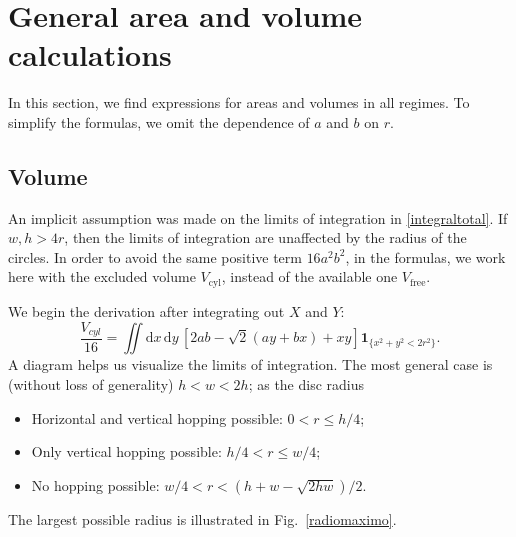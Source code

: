 \documentclass[superscriptaddress,pre,reprint,showpacs,twocolumn]{revtex4-1}
\newcommand{\rd}[1]{\mathrm{d}{#1} \,}
\newcommand{\indicatorsymbol}{\mathbf{1}}
\newcommand{\indicator}[1]{\indicatorsymbol_{ \{   #1 \} } }
\begin{document}




\appendix
\section{General area and volume calculations}
\label{app:area_volume}

In this section, we find expressions for areas and volumes in all 
regimes.
To simplify the formulas, we omit the dependence
of $a$ and $b$ on $r$.



\subsection{Volume}\label{app:volume}


An implicit assumption was made on the limits of integration
in \eqref{integraltotal}. If $w, h > 4r$, then the limits of integration
are unaffected by the radius of the circles.
In order to avoid the same positive term $16a^2b^2$,  %
in the formulas, we work here with
the excluded volume $V_\text{cyl}$, instead of the available one $V_\text{free}$. 


We begin the derivation after integrating out $X$ and $Y$:
\begin{equation}\label{VolumenGeneral}
\frac{V_{cyl}}{16}  =\iint \rd x \rd y \left[ 2ab-\sqrt{2}(ay+bx)+x y \right]
\indicator{x^2+y^2 < 2r^2 }.
\end{equation}
A diagram helps us visualize the limits of integration. The most general
case is (without loss of generality) $h < w < 2h$; as the disc radius 
\begin{itemize}
\item Horizontal and vertical hopping possible: $0 <r \leq h/4$;
\item Only vertical hopping possible: $h/4 < r \leq w/4$;
\item No hopping possible: $w/4 < r < (h+w - \sqrt{2hw}) / 2$.
\end{itemize}
The largest possible radius is illustrated in Fig.~\ref{radiomaximo}.
\end{document}
